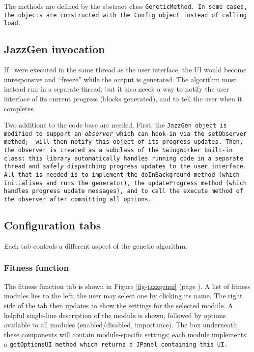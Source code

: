 The methods are defined by the abstract class \tt{GeneticMethod}. In some cases, the objects are constructed with the \tt{Config} object instead of calling \tt{load}.

\subsection{JazzGen invocation}

If \jg\ were executed in the same thread as the user interface, the UI would become unresponsive and ``freeze'' while the output is generated. The algorithm must instead run in a separate thread, but it also needs a way to notify the user interface of its current progress (blocks generated), and to tell the user when it completes.

Two additions to the code base are needed. First, the \tt{JazzGen} object is modified to support an \emph{observer} which can hook-in via the \tt{setObserver} method; \jg\ will then notify this object of its progress updates. Then, the observer is created as a subclass of the \tt{SwingWorker} built-in class: this library automatically handles running code in a separate thread and \emph{safely} dispatching progress updates to the user interface. All that is needed is to implement the \tt{doInBackground} method (which initialises and runs the generator), the \tt{updateProgress} method (which handles progress update messages), and to call the \tt{execute} method of the observer after committing all options.

\subsection{Configuration tabs}

Each tab controls a different aspect of the genetic algorithm.

\subsubsection{Fitness function}

The fitness function tab is shown in Figure \ref{fig-jazzgenui} (page \pageref{fig-jazzgenui}). A list of fitness modules lies to the left; the user may select one by clicking its name. The right side of the tab then updates to show the settings for the selected module. A helpful single-line description of the module is shown, followed by options available to all modules (enabled/disabled, importance). The box underneath these components will contain module-specific settings; each module implements a \tt{getOptionsUI} method which returns a \tt{JPanel} containing this UI.

